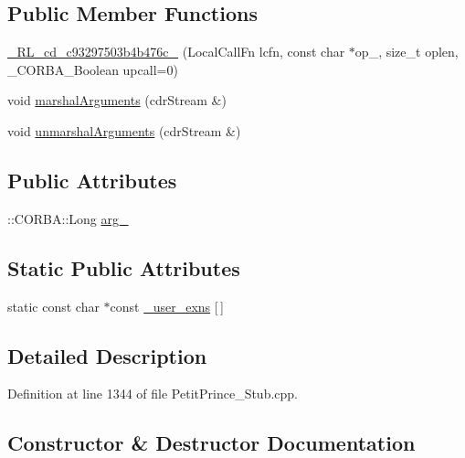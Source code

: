 \subsection*{Public Member Functions}
\begin{DoxyCompactItemize}
\item 
\hyperlink{class__0_r_l__cd__c93297503b4b476c__80000000_ad308c310fa659020a5700f1b678304ed}{\+\_\+R\+L\+\_\+cd\+\_\+c93297503b4b476c\+\_} (Local\+Call\+Fn lcfn, const char $\ast$op\+\_\+, size\+\_\+t oplen, \+\_\+\+C\+O\+R\+B\+A\+\_\+\+Boolean upcall=0)
\item 
void \hyperlink{class__0_r_l__cd__c93297503b4b476c__80000000_a4407e26307e25abe6ac90f6d213a27de}{marshal\+Arguments} (cdr\+Stream \&)
\item 
void \hyperlink{class__0_r_l__cd__c93297503b4b476c__80000000_a676d81c8b60993025cc6aca345e10ef3}{unmarshal\+Arguments} (cdr\+Stream \&)
\end{DoxyCompactItemize}
\subsection*{Public Attributes}
\begin{DoxyCompactItemize}
\item 
\+::C\+O\+R\+B\+A\+::\+Long \hyperlink{class__0_r_l__cd__c93297503b4b476c__80000000_a4c028c6d9f97e31f6f1c2daea15de53d}{arg\+\_}
\end{DoxyCompactItemize}
\subsection*{Static Public Attributes}
\begin{DoxyCompactItemize}
\item 
static const char $\ast$const \hyperlink{class__0_r_l__cd__c93297503b4b476c__80000000_a7f9774a33ed16a3fa01df1cefaf8fcb4}{\+\_\+user\+\_\+exns} \mbox{[}$\,$\mbox{]}
\end{DoxyCompactItemize}


\subsection{Detailed Description}


Definition at line 1344 of file Petit\+Prince\+\_\+\+Stub.\+cpp.



\subsection{Constructor \& Destructor Documentation}
